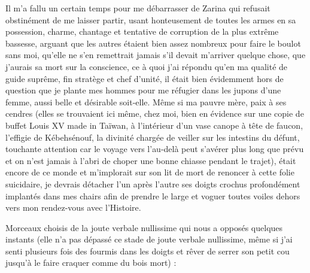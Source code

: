 %
Il m’a fallu un certain temps pour me débarrasser de Zarina qui refusait obstinément de me laisser partir, usant honteusement de toutes les armes en sa possession, charme, chantage et tentative de corruption de la plus extrême bassesse, arguant que les autres étaient bien assez nombreux pour faire le boulot sans moi, qu’elle ne s’en remettrait jamais s’il devait m’arriver quelque chose, que j’aurais sa mort sur la conscience, ce à quoi j’ai répondu qu’en ma qualité de guide suprême, fin stratège et chef d’unité, il était bien évidemment hors de question que je plante mes hommes pour me réfugier dans les jupons d’une femme, aussi belle et désirable soit-elle. \label{rat:22}Même si ma pauvre mère, paix à ses cendres (elles se trouvaient ici même, chez moi, bien en évidence sur une copie de buffet Louis XV made in Taïwan, à l’intérieur d’un vase canope à tête de faucon, l’effigie de Kébehsénouf, la divinité chargée de veiller sur les intestins du défunt, touchante attention car le voyage vers l’au-delà peut s’avérer plus long que prévu et on n’est jamais à l’abri de choper une bonne chiasse pendant le trajet), était encore de ce monde et m’implorait sur son lit de mort de renoncer à cette folie suicidaire, je devrais détacher l’un après l’autre ses doigts crochus profondément implantés dans mes chairs afin de prendre le large et voguer toutes voiles dehors vers mon rendez-vous avec l’Histoire.

Morceaux choisis de la joute verbale nullissime qui nous a opposés quelques instants (elle n’a pas dépassé ce stade de joute verbale nullissime, même si j’ai senti plusieurs fois des fourmis dans les doigts et rêver de serrer son petit cou jusqu’à le faire craquer comme du bois mort) :

